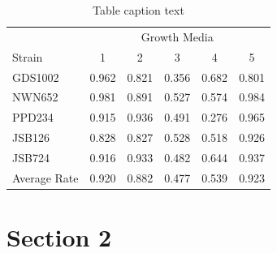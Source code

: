 \documentclass[justified]{tufte-book} %
\begin{document}
\begin{table} %
\centering %
\begin{tabular}{l c c c c c} %
\toprule %
& \multicolumn{5}{c}{Growth Media} \\ %
\cmidrule(l){2-6} %
Strain & 1 & 2 & 3 & 4 & 5\\ %
\midrule %
GDS1002 & 0.962 & 0.821 & 0.356 & 0.682 & 0.801\\ %
NWN652 & 0.981 & 0.891 & 0.527 & 0.574 & 0.984\\ %
PPD234 & 0.915 & 0.936 & 0.491 & 0.276 & 0.965\\ %
JSB126 & 0.828 & 0.827 & 0.528 & 0.518 & 0.926\\ %
JSB724 & 0.916 & 0.933 & 0.482 & 0.644 & 0.937\\ %
\midrule %
\midrule %
Average Rate & 0.920 & 0.882 & 0.477 & 0.539 & 0.923\\ %
\bottomrule %
\end{tabular}
\caption{Table caption text} %
\label{tab:template} %
\end{table}



\section{Section 2}
\end{document}

